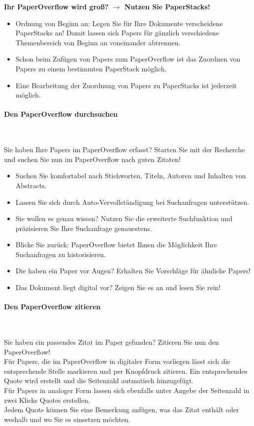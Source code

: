 \documentclass[a4paper,12pt]{article}
\begin{document}
\textbf{Ihr PaperOverflow wird groß? $\to$ Nutzen Sie PaperStacks!}
\begin{itemize}
	\item Ordnung von Beginn an: Legen Sie für Ihre Dokumente verscheidene PaperStacks an! Damit lassen sich Papers für gänzlich verschiedene Themenbereich von Beginn an voneinander abtrennen.
	\item Schon beim Zufügen von Papers zum PaperOverflow ist das Zuordnen von Papers zu einem bestimmten PaperStack möglich.
	\item Eine Bearbeitung der Zuordnung von Papers zu PaperStacks ist jederzeit möglich.
\end{itemize}

\paragraph{Den PaperOverflow durchsuchen}\ 

Sie haben Ihre Papers im PaperOverflow erfasst? Starten Sie mit der Recherche und suchen Sie nun im PaperOverflow nach guten Zitaten!

\begin{itemize}
	\item Suchen Sie komfortabel nach Stichworten, Titeln, Autoren und Inhalten von Abstracts.
	\item Lassen Sie sich durch Auto-Vervollständigung bei Suchanfragen unterstützen.
	\item Sie wollen es genau wissen? Nutzen Sie die erweiterte Suchfunktion und präzisieren Sie Ihre Suchanfrage genauestens.
	\item Blicke Sie zurück: PaperOverflow bietet Ihnen die Möglichkeit Ihre Suchanfragen zu historisieren.
	\item Die haben ein Paper vor Augen? Erhalten Sie Vorschläge für ähnliche Papers!
	\item Das Dokument liegt digital vor? Zeigen Sie es an und lesen Sie rein!
\end{itemize}

\paragraph{Den PaperOverflow zitieren}\ 

Sie haben ein passendes Zitat im Paper gefunden? Zitieren Sie nun den PaperOverflow!\\

Für Papers, die im PaperOverflow in digitaler Form vorliegen lässt sich die entsprechende Stelle markieren und per Knopfdruck zitieren. Ein entsprechendes Quote wird erstellt und die Seitenzahl autmatisch hinzugefügt.\\
Für Papers in analoger Form lassen sich ebenfalls unter Angebe der Seitenzahl in zwei Klicks Quotes erstellen.\\
Jedem Quote können Sie eine Bemerkung anfügen, was das Zitat enthält oder weshalb und wo Sie es einsetzen möchten.\\
\end{document}
